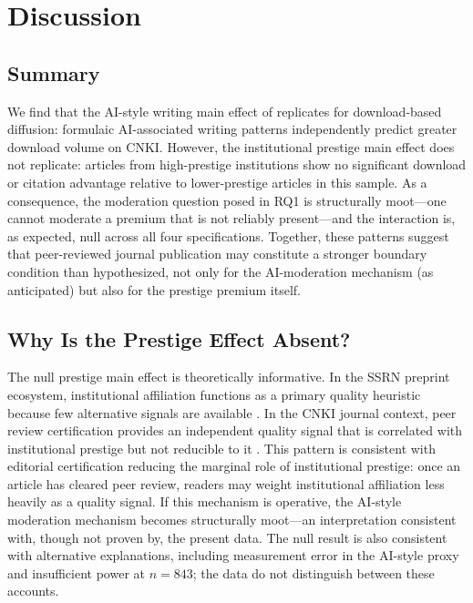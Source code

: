 \documentclass[12pt,a4paper]{article}
\begin{document}
\section{Discussion}
\label{sec:discussion}

\subsection{Summary}

We find that the AI-style writing main effect of \citet{JoLi2026}
replicates for download-based diffusion: formulaic AI-associated
writing patterns independently predict greater download volume on CNKI.
However, the institutional prestige main effect does not replicate:
articles from high-prestige institutions show no significant download
or citation advantage relative to lower-prestige articles in this sample.
As a consequence, the moderation question posed in RQ1 is structurally
moot---one cannot moderate a premium that is not reliably present---and
the interaction is, as expected, null across all four specifications.
Together, these patterns suggest that peer-reviewed journal publication
may constitute a stronger boundary condition than hypothesized, not only
for the AI-moderation mechanism (as anticipated) but also for the
prestige premium itself.

\subsection{Why Is the Prestige Effect Absent?}

The null prestige main effect is theoretically informative.
In the SSRN preprint ecosystem, institutional affiliation functions as
a primary quality heuristic because few alternative signals are
available \citep{JoLi2026}.
In the CNKI journal context, peer review certification provides an
independent quality signal that is correlated with institutional
prestige but not reducible to it \citep{Bornmann2008}.
This pattern is consistent with editorial certification reducing the
marginal role of institutional prestige: once an article has cleared
peer review, readers may weight institutional affiliation less heavily
as a quality signal.
If this mechanism is operative, the AI-style moderation mechanism
becomes structurally moot---an interpretation consistent with, though
not proven by, the present data.
The null result is also consistent with alternative explanations,
including measurement error in the AI-style proxy and insufficient
power at $n=843$; the data do not distinguish between these accounts.
\end{document}
